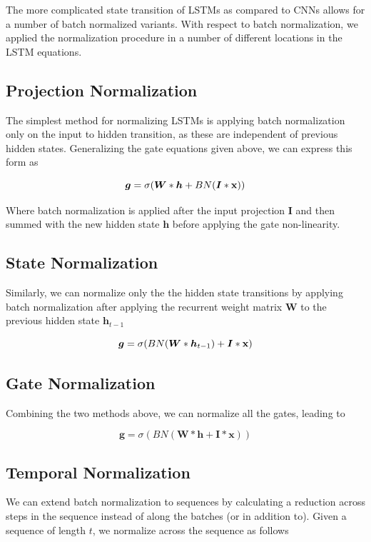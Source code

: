 \documentclass{article}
\def\x{{\mathbf x}}
\begin{document}
The more complicated state transition of LSTMs as compared to CNNs allows for a number of batch normalized variants. With respect to batch normalization, we applied the normalization procedure in a number of different locations in the LSTM equations.

\subsection{Projection Normalization} The simplest method for normalizing LSTMs is applying batch normalization only on the input to hidden transition, as these are independent of previous hidden states. Generalizing the gate equations given above, we can express this form as

\begin{equation}
	\boldsymbol g = \sigma(\boldsymbol W * \boldsymbol h + BN(\boldsymbol I * \x)) \\
\end{equation}
 
Where batch normalization is applied after the input projection $\boldsymbol I$ and then summed with the new hidden state $\boldsymbol h$ before applying the gate non-linearity.

\subsection{State Normalization} Similarly, we can normalize only the the hidden state transitions by applying batch normalization after applying the recurrent weight matrix $\boldsymbol W$ to the previous hidden state $\boldsymbol h_{t-1}$

\begin{equation}
	\boldsymbol g = \sigma(BN(\boldsymbol W * \boldsymbol h_{t-1}) + \boldsymbol I * \x) \\
\end{equation} 

\subsection{Gate Normalization} Combining the two methods above, we can normalize all the gates, leading to 

\begin{equation}
	\boldsymbol g = \sigma(BN(\boldsymbol W * \boldsymbol h + \boldsymbol I * \x)) \nonumber
\end{equation}

\subsection{Temporal Normalization}
We can extend batch normalization to sequences by calculating a reduction across steps in the sequence instead of along the batches (or in addition to). Given a sequence of length $t$, we normalize across the sequence as follows
\end{document}
